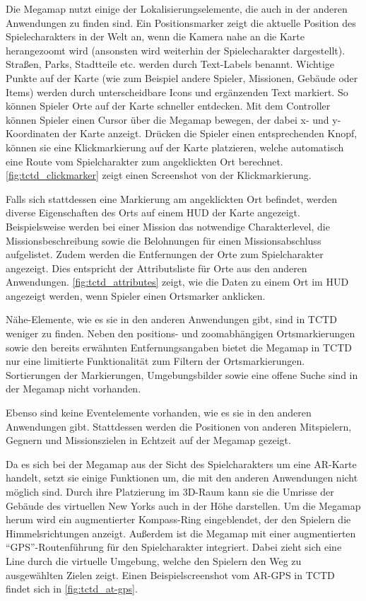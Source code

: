 Die Megamap nutzt einige der Lokalisierungselemente, die auch in der anderen Anwendungen zu finden sind.
Ein Positionsmarker zeigt die aktuelle Position des Spielecharakters in der Welt an, wenn die Kamera nahe an die Karte herangezoomt wird (ansonsten wird weiterhin der Spielecharakter dargestellt).
Straßen, Parks, Stadtteile etc. werden durch Text-Labels benannt.
Wichtige Punkte auf der Karte (wie zum Beispiel andere Spieler, Missionen, Gebäude oder Items) werden durch unterscheidbare Icons und ergänzenden Text markiert.
So können Spieler Orte auf der Karte schneller entdecken.
Mit dem Controller können Spieler einen Cursor über die Megamap bewegen, der dabei x- und y-Koordinaten der Karte anzeigt.
Drücken die Spieler einen entsprechenden Knopf, können sie eine Klickmarkierung auf der Karte platzieren, welche automatisch eine Route vom Spielcharakter zum angeklickten Ort berechnet.
\autoref{fig:tctd_clickmarker} zeigt einen Screenshot von der Klickmarkierung.

Falls sich stattdessen eine Markierung am angeklickten Ort befindet, werden diverse Eigenschaften des Orts auf einem HUD der Karte angezeigt.
Beispielsweise werden bei einer Mission das notwendige Charakterlevel, die Missionsbeschreibung sowie die Belohnungen für einen Missionsabschluss aufgelistet.
Zudem werden die Entfernungen der Orte zum Spielcharakter angezeigt.
Dies entspricht der Attributsliste für Orte aus den anderen Anwendungen.
\autoref{fig:tctd_attributes} zeigt, wie die Daten zu einem Ort im HUD angezeigt werden, wenn Spieler einen Ortsmarker anklicken.

Nähe-Elemente, wie es sie in den anderen Anwendungen gibt, sind in TCTD weniger zu finden.
Neben den positions- und zoomabhängigen Ortsmarkierungen sowie den bereits erwähnten Entfernungsangaben bietet die Megamap in TCTD nur eine limitierte Funktionalität zum Filtern der Ortsmarkierungen.
Sortierungen der Markierungen, Umgebungsbilder sowie eine offene Suche sind in der Megamap nicht vorhanden.

Ebenso sind keine Eventelemente vorhanden, wie es sie in den anderen Anwendungen gibt.
Stattdessen werden die Positionen von anderen Mitspielern, Gegnern und Missionszielen in Echtzeit auf der Megamap gezeigt.

Da es sich bei der Megamap aus der Sicht des Spielcharakters um eine AR-Karte handelt, setzt sie einige Funktionen um, die mit den anderen Anwendungen nicht möglich sind.
Durch ihre Platzierung im 3D-Raum kann sie die Umrisse der Gebäude des virtuellen New Yorks auch in der Höhe darstellen.
Um die Megamap herum wird ein augmentierter Kompass-Ring eingeblendet, der den Spielern die Himmelsrichtungen anzeigt.
Außerdem ist die Megamap mit einer augmentierten \enquote{GPS}-Routenführung für den Spielcharakter integriert.
Dabei zieht sich eine Line durch die virtuelle Umgebung, welche den Spielern den Weg zu ausgewählten Zielen zeigt.
Einen Beispielscreenshot vom AR-GPS in TCTD findet sich in \autoref{fig:tctd_at-gps}.

